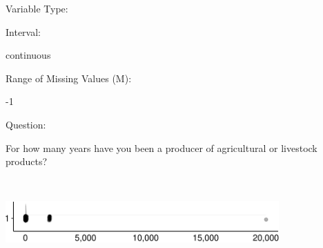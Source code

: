 \documentclass[
]{article}
\begin{document}
\begin{minipage}[t]{0.3\linewidth}

Variable Type:

\end{minipage}%
\begin{minipage}[t]{0.7\linewidth}

\end{minipage}

\begin{minipage}[t]{0.3\linewidth}

Interval:

\end{minipage}%
\begin{minipage}[t]{0.7\linewidth}

continuous

\end{minipage}

\begin{minipage}[t]{0.3\linewidth}

Range of Missing Values (M):

\end{minipage}%
\begin{minipage}[t]{0.7\linewidth}

-1

\end{minipage}

\begin{minipage}[t]{0.3\linewidth}

Question:

\end{minipage}%
\begin{minipage}[t]{0.7\linewidth}

For how many years have you been a producer of agricultural or livestock
products?

\end{minipage}

\begin{minipage}[t]{0.3\linewidth}

~

\end{minipage}%
\begin{minipage}[t]{0.7\linewidth}

\includegraphics[width=396px]{codebook_template_files/figure-latex/q0_9_rainplot-1}

\end{minipage}
 \vspace*{-6mm} 
\end{document}
